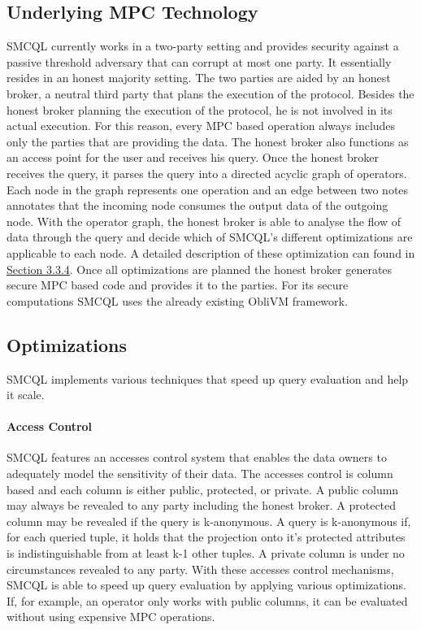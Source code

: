 \subsection{Underlying MPC Technology}
SMCQL currently works in a two-party setting and provides security against a passive threshold adversary that can corrupt at most one party.  It essentially resides in an honest majority setting. The two parties are aided by an honest broker, a neutral third party that plans the execution of the protocol. Besides the honest broker planning the execution of the protocol, he is not involved in its actual execution. For this reason, every MPC based operation always includes only the parties that are providing the data.
The honest broker also functions as an access point for the user and receives his query. 
Once the honest broker receives the query, it parses the query into a directed acyclic graph of operators. Each node in the graph represents one operation and an edge between two notes annotates that the incoming node consumes the output data of the outgoing node. With the operator graph, the honest broker is able to analyse the flow of data through the query and decide which of SMCQL's different optimizations are applicable to each node. 
A detailed description of these optimization can found in \hyperref[sec:Optimizations_smcql]{Section 3.3.4}. Once all optimizations are planned the honest broker generates secure MPC based code and provides it to the parties. For its secure computations SMCQL uses the already existing ObliVM framework.

	



\label{sec:Optimizations_smcql}
\subsection{Optimizations}
SMCQL implements various techniques that speed up query evaluation and help it scale. 
\label{Accesses_label}
\paragraph{Access Control}
SMCQL features an accesses control system that enables the data owners to adequately model the sensitivity of their data. 
The accesses control is column based and each column is either public, protected, or private. 
A public column may always be revealed to any party including the honest broker. A protected column may be revealed if the query is k-anonymous. A query is k-anonymous if, for each queried tuple, it holds that the projection onto it's protected attributes is indistinguishable from at least k-1 other tuples. A private column is under no circumstances revealed to any party. With these accesses control mechanisms, SMCQL is able to speed up query evaluation by applying various optimizations. If, for example, an operator only works with public columns, it can be evaluated without using expensive MPC operations.
